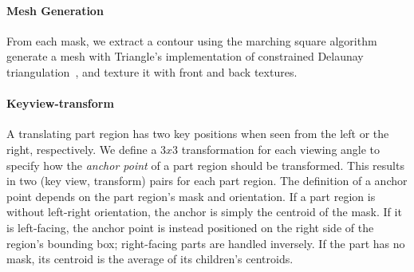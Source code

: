 \paragraph{Mesh Generation} From each mask, we extract a contour using the marching square algorithm~\cite{lorensen1998marching} generate a mesh with Triangle's implementation of constrained Delaunay triangulation~\cite{shewchuk96b}, and texture it with front and back textures.

\begin{comment}
During animation, foot orientation is determined, per frame, by the bend of the character's leg .
If a figure's feet have left-right orientations, we mirror their lower leg, starting midway between ankle and knee keypoint, to create four distinct masks and textures corresponding to all foot orientation combinations (see Figure~\ref{fig:mock_LR_25D_characters}).
\end{comment}

\paragraph{Keyview-transform} A translating part region has two key positions when seen from the left or the right, respectively. We define a $3x3$ transformation for each viewing angle to specify how the \textit{anchor point} of a part region should be transformed. This results in two (key view, transform) pairs for each part region. The definition of a anchor point depends on the part region's mask and orientation. If a part region is without left-right orientation, the anchor is simply the centroid of the mask. If it is left-facing, the anchor point is instead positioned on the right side of the region's bounding box; right-facing parts are handled inversely. If the part has no mask, its centroid is the average of its children's centroids.

\begin{comment}
For each part region that translates, we compute a series of \textit{keyview-transform} pairs. These are 3x3 transformation matrices that define how a part should be modified when observed from a specific view angle $\theta$ (discussed in Section.XXXXXXXX).
We first define a 2D \textit{anchor point} for the part region.
The anchor point is the centroid of the part region's mask, if it exists and has no left-right orientation.
If the part region is left-oriented, anchor point is the projection of the mask centroid upon the right side of the mask's bounding box.
If the part is no mask, the centroid is the average of its children's centroids.
We then insert two keyview-transform pairs.
The left-oriented ($\theta = \pi/2$) transform translates the part's anchor point left until it intersects the boundary of its parent's mask.
The right-oriented ($\theta = 3\pi/2$) is created similar by translation to the right.
See Figure~XXXXX.a for an example of these.
\end{comment}



